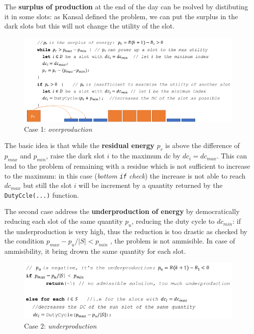 \documentclass[10pt,a4paper]{report}
\theoremstyle{definition}
\begin{document}
The \textbf{surplus of production} at the end of the day can be rsolved by distibuting it in some slots: as Kansal defined the problem, we can put the surplus in the dark slots but this will not change the utility of the slot.
\begin{figure}[h]
	\centering\includegraphics[scale=0.70]{images/Pasted image 20230509172945.png}
	\caption{Case 1: \textit{overproduction}}
\end{figure}


The basic idea is that while the \textbf{residual energy $p_{r}$} is above the difference of $p_{max}$ and $p_{min}$, raise the dark slot $i$ to the maximum dc by $dc_{i} = dc_{max}$. This can lead to the problem of remaining with a residue which is not sufficient to increase to the maximum: in this case (\textit{bottom \texttt{if} check}) the increase is not able to reach $dc_{max}$ but still the slot $i$ will be increment by a quantity returned by the \texttt{DutyCcle(...)} function.

The second case address the \textbf{underproduction of energy} by democratically reducing each slot of the same quantity $p_{u}$, reducing the duty cycle to $dc_{min}$: if the underproduction is very high, thus the reduction is too drastic as checked by the condition $p_{max}-p_{u}/|S| < p_{min}$ , the problem is not ammisible. In case of ammisibility, it bring drown the same quantity for each slot.

\begin{figure}[h]
	\centering\includegraphics[scale=0.50]{images/Pasted image 20230510093207.png}
	\caption{Case 2: \textit{underproduction}}
\end{figure}
\end{document}
